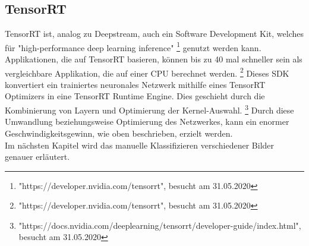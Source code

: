 \documentclass[a4paper,oneside,12pt]{report}
\begin{document}
\begin{onehalfspace}
		\subsection{TensorRT}
		TensorRT ist, analog zu Deepstream, auch ein Software Development Kit, welches für "high-performance deep learning inference"
		\footnote{"https://developer.nvidia.com/tensorrt", besucht am 31.05.2020} genutzt werden kann.
		Applikationen, die auf TensorRT basieren, können bis zu 40 mal schneller sein als vergleichbare Applikation, die auf einer CPU berechnet werden.
		\footnote{"https://developer.nvidia.com/tensorrt", besucht am 31.05.2020}
		Dieses SDK konvertiert ein trainiertes neuronales Netzwerk mithilfe eines TensorRT Optimizers in eine TensorRT Runtime Engine. Dies geschieht durch die Kombinierung von Layern und Optimierung der Kernel-Auswahl.
		\footnote{"https://docs.nvidia.com/deeplearning/tensorrt/developer-guide/index.html", besucht am 31.05.2020}
		Durch diese Umwandlung beziehungsweise Optimierung des Netzwerkes, kann ein enormer Geschwindigkeitsgewinn, wie oben beschrieben, erzielt werden. \\
		Im nächsten Kapitel wird das manuelle Klassifizieren verschiedener Bilder genauer erläutert.
	\end{onehalfspace}
\end{document}
